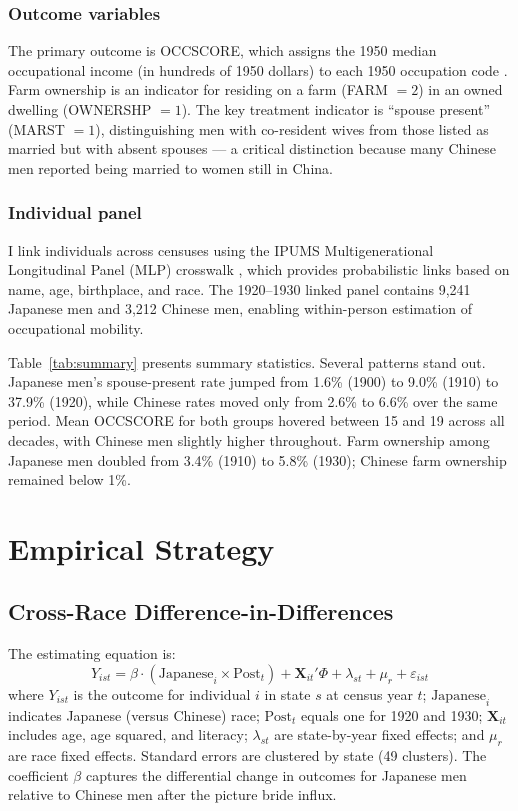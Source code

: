 \documentclass[12pt]{article}
\begin{document}
\subsubsection*{Outcome variables}  The primary outcome is OCCSCORE, which assigns the 1950 median occupational income (in hundreds of 1950 dollars) to each 1950 occupation code \citep{sobek1996comparison}. Farm ownership is an indicator for residing on a farm (FARM $= 2$) in an owned dwelling (OWNERSHP $= 1$). The key treatment indicator is ``spouse present'' (MARST $= 1$), distinguishing men with co-resident wives from those listed as married but with absent spouses --- a critical distinction because many Chinese men reported being married to women still in China.

\subsubsection*{Individual panel}  I link individuals across censuses using the IPUMS Multigenerational Longitudinal Panel (MLP) crosswalk \citep{helgertz2023multigenerational}, which provides probabilistic links based on name, age, birthplace, and race. The 1920--1930 linked panel contains 9,241 Japanese men and 3,212 Chinese men, enabling within-person estimation of occupational mobility.



Table~\ref{tab:summary} presents summary statistics. Several patterns stand out. Japanese men's spouse-present rate jumped from 1.6\% (1900) to 9.0\% (1910) to 37.9\% (1920), while Chinese rates moved only from 2.6\% to 6.6\% over the same period. Mean OCCSCORE for both groups hovered between 15 and 19 across all decades, with Chinese men slightly higher throughout. Farm ownership among Japanese men doubled from 3.4\% (1910) to 5.8\% (1930); Chinese farm ownership remained below 1\%.

\section{Empirical Strategy}

\subsection{Cross-Race Difference-in-Differences}

The estimating equation is:
\begin{equation}
Y_{ist} = \beta \cdot (\text{Japanese}_i \times \text{Post}_t) + \mathbf{X}_{it}'\Phi + \lambda_{st} + \mu_r + \varepsilon_{ist}
\label{eq:did}
\end{equation}
where $Y_{ist}$ is the outcome for individual $i$ in state $s$ at census year $t$; $\text{Japanese}_i$ indicates Japanese (versus Chinese) race; $\text{Post}_t$ equals one for 1920 and 1930; $\mathbf{X}_{it}$ includes age, age squared, and literacy; $\lambda_{st}$ are state-by-year fixed effects; and $\mu_r$ are race fixed effects. Standard errors are clustered by state (49 clusters). The coefficient $\beta$ captures the differential change in outcomes for Japanese men relative to Chinese men after the picture bride influx.
\end{document}
